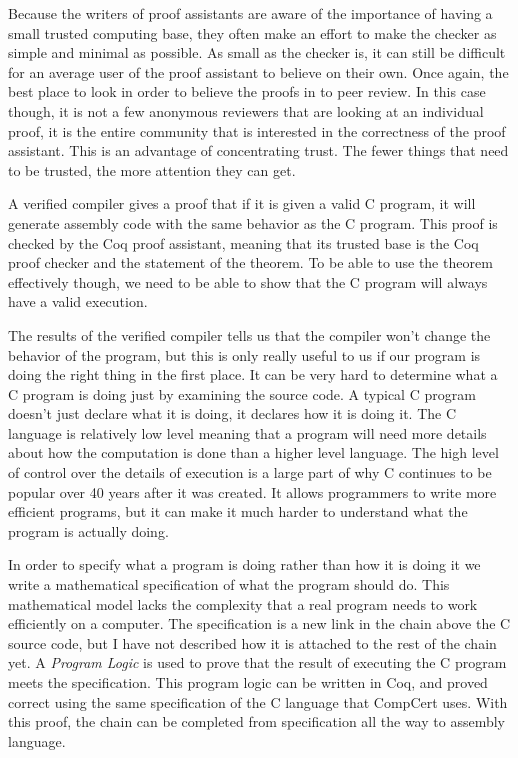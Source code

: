 \documentclass{puthesis}
\begin{document}
Because the writers of proof assistants are aware of the importance of
having a small trusted computing base, they often make an effort to
make the checker as simple and minimal as possible. As small as the
checker is, it can still be difficult for an average user of the proof
assistant to believe on their own. Once again, the best place to look
in order to believe the proofs in to peer review. In this case though,
it is not a few anonymous reviewers that are looking at an individual
proof, it is the entire community that is interested in the
correctness of the proof assistant. This is an advantage of
concentrating trust. The fewer things that need to be trusted, the
more attention they can get.


A verified compiler gives a proof that if it is given a valid C
program, it will generate assembly code with the same behavior as the
C program. This proof is checked by the Coq proof assistant, meaning
that its trusted base is the Coq proof checker and the statement of
the theorem. To be able to use the theorem effectively though, we need
to be able to show that the C program will always have a valid
execution. 

The results of the verified compiler tells us that the compiler won't
change the behavior of the program, but this is only really useful to
us if our program is doing the right thing in the first place. It can
be very hard to determine what a C program is doing just by examining
the source code.  A typical C program doesn't just declare what it is
doing, it declares how it is doing it. The C language is relatively
low level meaning that a program will need more details about how the
computation is done than a higher level language. The high level of
control over the details of execution is a large part of why C
continues to be popular over 40 years after it was created. It allows
programmers to write more efficient programs, but it can make it much
harder to understand what the program is actually doing.

In order to specify what a program is doing rather than how it is
doing it we write a mathematical specification of what the program
should do. This mathematical model lacks the complexity that a real
program needs to work efficiently on a computer.  The specification is
a new link in the chain above the C source code, but I have not
described how it is attached to the rest of the chain yet. A
\emph{Program Logic} is used to prove that the result of executing the
C program meets the specification. This program logic can be written
in Coq, and proved correct using the same specification of the C
language that CompCert uses. With this proof, the chain can be
completed from specification all the way to assembly language.
\end{document}
